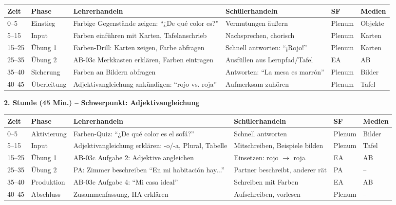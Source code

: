 \documentclass[11pt,a4paper]{article}
\begin{document}
\begin{longtable}{|p{1cm}|p{1.5cm}|p{4cm}|p{3cm}|p{2cm}|p{2cm}|}
\hline
\textbf{Zeit} & \textbf{Phase} & \textbf{Lehrerhandeln} & \textbf{Schülerhandeln} & \textbf{SF} & \textbf{Medien} \\
\hline
\endhead

0--5 & Einstieg & Farbige Gegenstände zeigen: ``¿De qué color es?'' & Vermutungen äußern & Plenum & Objekte \\
\hline

5--15 & Input & Farben einführen mit Karten, Tafelanschrieb & Nachsprechen, chorisch & Plenum & Karten \\
\hline

15--25 & Übung 1 & Farben-Drill: Karten zeigen, Farbe abfragen & Schnell antworten: ``¡Rojo!'' & Plenum & Karten \\
\hline

25--35 & Übung 2 & AB-03c Merkkasten erklären, Farben eintragen & Ausfüllen aus Lernpfad/Tafel & EA & AB \\
\hline

35--40 & Sicherung & Farben an Bildern abfragen & Antworten: ``La mesa es marrón'' & Plenum & Bilder \\
\hline

40--45 & Überleitung & Adjektivangleichung ankündigen: ``rojo vs. roja'' & Aufmerksam zuhören & Plenum & Tafel \\
\hline
\end{longtable}

\vspace{1em}

\textbf{2. Stunde (45 Min.) -- Schwerpunkt: Adjektivangleichung}

\begin{longtable}{|p{1cm}|p{1.5cm}|p{4cm}|p{3cm}|p{2cm}|p{2cm}|}
\hline
\textbf{Zeit} & \textbf{Phase} & \textbf{Lehrerhandeln} & \textbf{Schülerhandeln} & \textbf{SF} & \textbf{Medien} \\
\hline
\endhead

0--5 & Aktivierung & Farben-Quiz: ``¿De qué color es el sofá?'' & Schnell antworten & Plenum & Bilder \\
\hline

5--15 & Input & Adjektivangleichung erklären: -o/-a, Plural, Tabelle & Mitschreiben, Beispiele bilden & Plenum & Tafel \\
\hline

15--25 & Übung 1 & AB-03c Aufgabe 2: Adjektive angleichen & Einsetzen: rojo $\rightarrow$ roja & EA & AB \\
\hline

25--35 & Übung 2 & PA: Zimmer beschreiben ``En mi habitación hay...'' & Partner beschreibt, anderer rät & PA & -- \\
\hline

35--40 & Produktion & AB-03c Aufgabe 4: ``Mi casa ideal'' & Schreiben mit Farben & EA & AB \\
\hline

40--45 & Abschluss & Zusammenfassung, HA erklären & Aufschreiben, vorlesen & Plenum & -- \\
\hline
\end{longtable}
\end{document}
